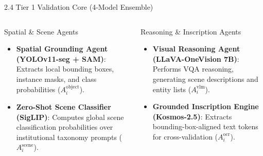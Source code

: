 \documentclass[aspectratio=169,11pt]{beamer}
\begin{document}
\begin{frame}{2.4 Tier 1 Validation Core (4-Model Ensemble)}
\footnotesize
\begin{columns}[T]
\begin{block}{Spatial \& Scene Agents}
\begin{itemize}
  \item \textbf{Spatial Grounding Agent (YOLOv11-seg + SAM)}: Extracts local bounding boxes, instance masks, and class probabilities ($A_i^{\text{object}}$).
  \item \textbf{Zero-Shot Scene Classifier (SigLIP)}: Computes global scene classification probabilities over institutional taxonomy prompts ($A_i^{\text{scene}}$).
\end{itemize}
\end{block}

\begin{block}{Reasoning \& Inscription Agents}
\begin{itemize}
  \item \textbf{Visual Reasoning Agent (LLaVA-OneVision 7B)}: Performs VQA reasoning, generating scene descriptions and entity lists ($A_i^{\text{vlm}}$).
  \item \textbf{Grounded Inscription Engine (Kosmos-2.5)}: Extracts bounding-box-aligned text tokens for cross-validation ($A_i^{\text{ocr}}$).
\end{itemize}
\end{block}
\end{columns}
\end{frame}
\end{document}
